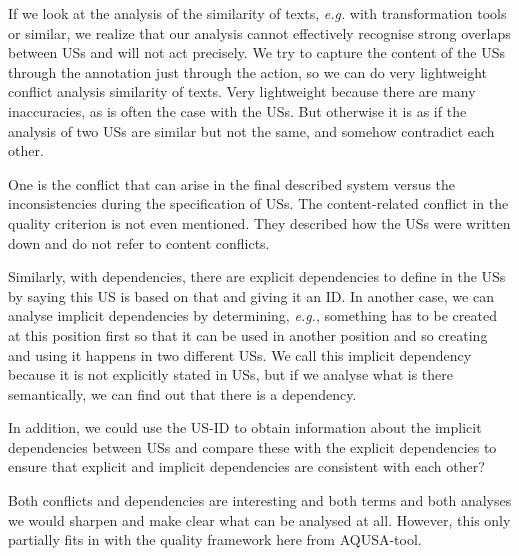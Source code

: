 If we look at the analysis of the similarity of texts, \emph{e.g.} with transformation tools or similar, we realize that our analysis cannot effectively recognise strong overlaps between USs and will not act precisely. We try to capture the content of the USs through the annotation just through the action, so we can do very lightweight conflict analysis similarity of texts. Very lightweight because there are many inaccuracies, as is often the case with the USs. But otherwise it is as if the analysis of two USs are similar but not the same, and somehow contradict each other.

One is the conflict that can arise in the final described system versus the inconsistencies during the specification of USs. The content-related conflict in the quality criterion is not even mentioned. They described how the USs were written down and do not refer to content conflicts. 

Similarly, with dependencies, there are explicit dependencies to define in the USs by saying this US is based on that and giving it an ID. In another case, we can analyse implicit dependencies by determining, \emph{e.g.}, something has to be created at this position first so that it can be used in another position and so creating and using it happens in two different USs. We call this implicit dependency because it is not explicitly stated in USs, but if we analyse what is there semantically, we can find out that there is a dependency.

In addition, we could use the US-ID to obtain information about the implicit dependencies between USs and compare these with the explicit dependencies to ensure that explicit and implicit dependencies are consistent with each other?

Both conflicts and dependencies are interesting and both terms and both analyses we would sharpen and make clear what can be analysed at all. However, this only partially fits in with the quality framework here from AQUSA-tool.

